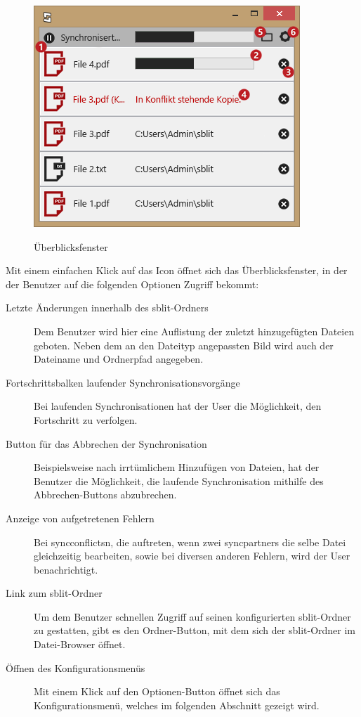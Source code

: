 \begin{figure}[H]
	\centering
	\includegraphics[scale=0.7]{images/systemtray.png}
	\label{ueberblicksfenster}
  \caption{Überblicksfenster}
\end{figure}

Mit einem einfachen Klick auf das Icon öffnet sich das Überblicksfenster, in der der
Benutzer auf die folgenden Optionen Zugriff bekommt:

\begin{description}

	\item[{Letzte Änderungen innerhalb des sblit-Ordners}]
		Dem Benutzer wird hier eine Auflistung der zuletzt hinzugefügten Dateien
		geboten. Neben dem an den Dateityp angepassten Bild wird auch der Dateiname
		und Ordnerpfad angegeben.

	\item[{Fortschrittsbalken laufender Synchronisationsvorgänge}]
		Bei laufenden Synchronisationen hat der User die Möglichkeit, den
		Fortschritt zu verfolgen.

	\item[{Button für das Abbrechen der Synchronisation}]
	  Beispielsweise nach irrtümlichem Hinzufügen von Dateien, hat der Benutzer die
		Möglichkeit, die laufende Synchronisation mithilfe des Abbrechen-Buttons
		abzubrechen.

	\item[{Anzeige von aufgetretenen Fehlern}]
		Bei \glspl{syncconflict}n, die auftreten, wenn zwei \glspl{syncpartner} die
		selbe Datei gleichzeitig bearbeiten, sowie bei diversen anderen Fehlern,
		wird der User benachrichtigt.

	\item[{Link zum sblit-Ordner}]
		Um dem Benutzer schnellen Zugriff auf seinen konfigurierten sblit-Ordner zu
		gestatten, gibt es den Ordner-Button, mit dem sich der sblit-Ordner im
		Datei-Browser öffnet.

	\item[{Öffnen des Konfigurationsmenüs}]
		Mit einem Klick auf den Optionen-Button öffnet sich das Konfigurationsmenü,
		welches im folgenden Abschnitt gezeigt wird.
\end{description}
